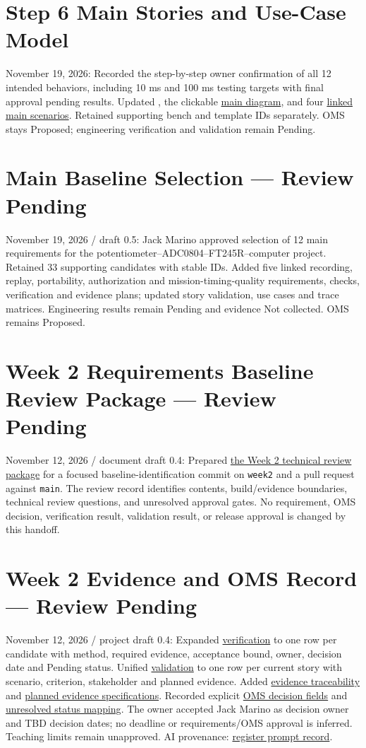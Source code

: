 \section{Step 6 Main Stories and Use-Case Model}
November 19, 2026: Recorded the step-by-step owner confirmation of all 12 intended behaviors, including 10 ms and 100 ms testing targets with final approval pending results. Updated , the clickable \hyperref[Figure:UseCaseDiagram]{main diagram}, and four \hyperref[Section:WeekTwoUseCases]{linked main scenarios}. Retained supporting bench and template IDs separately. OMS stays Proposed; engineering verification and validation remain Pending.

\section{Main Baseline Selection --- Review Pending}
November 19, 2026 / draft 0.5: Jack Marino approved selection of 12 main requirements for the potentiometer--ADC0804--FT245R--computer project. Retained 33 supporting candidates with stable IDs. Added five linked recording, replay, portability, authorization and mission-timing-quality requirements, checks, verification and evidence plans; updated story validation, use cases and trace matrices. Engineering results remain Pending and evidence Not collected. OMS remains Proposed.

\section{Week 2 Requirements Baseline Review Package --- Review Pending}
November 12, 2026 / document draft 0.4: Prepared
\hyperref[Section:WeekTwoReviewPackage]{the Week 2 technical review package}
for a focused baseline-identification commit on \texttt{week2} and a pull
request against \texttt{main}. The review record identifies contents,
build/evidence boundaries, technical review questions, and unresolved
approval gates. No requirement, OMS decision, verification result, validation
result, or release approval is changed by this handoff.

\section{Week 2 Evidence and OMS Record --- Review Pending}
November 12, 2026 / project draft 0.4: Expanded
\hyperref[Table:WeekTwoVerification]{verification} to one row per candidate
with method, required evidence, acceptance bound, owner, decision date and
Pending status. Unified \hyperref[Table:ValidationRegister]{validation} to
one row per current story with scenario, criterion, stakeholder and planned
evidence. Added \hyperref[Table:TraceabilityMatrix]{evidence traceability}
and \hyperref[Section:PlannedEvidence]{planned evidence specifications}.
Recorded explicit \hyperref[Table:OMSDecisionFields]{OMS decision fields}
and \hyperref[Table:OMSStatusMapping]{unresolved status mapping}.
The owner accepted Jack Marino as decision owner and TBD decision dates;
no deadline or requirements/OMS approval is inferred. Teaching limits remain
unapproved. AI provenance:
\hyperref[Section:WeekTwoRegisterPrompt]{register prompt record}.


